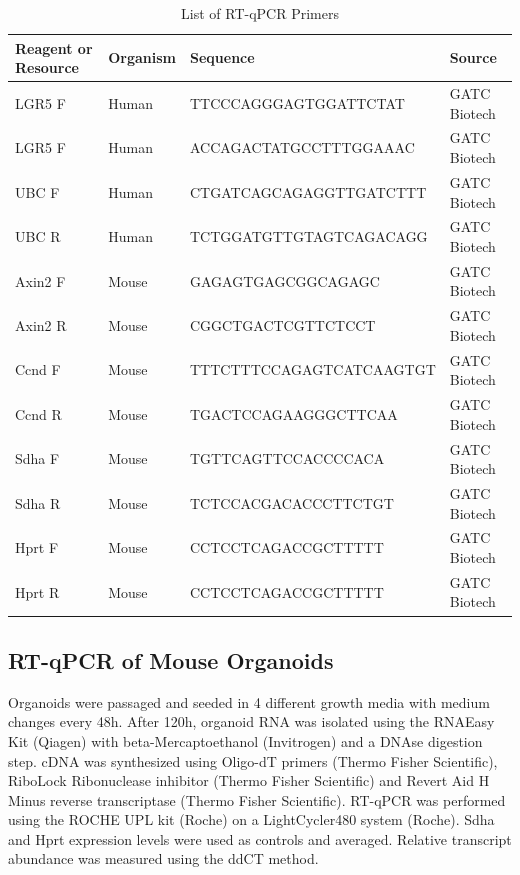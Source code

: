\begin{flushleft}
\begin{table}[htb]
\caption{List of RT-qPCR Primers}
\label{tab:qpcr} %
\begin{tabularx}{\textwidth}{lXll}
\toprule
\textbf{Reagent or Resource} & \textbf{Organism} & \textbf{Sequence} & \textbf{Source} \\
\midrule
LGR5 F & Human & TTCCCAGGGAGTGGATTCTAT & GATC Biotech \\
LGR5 F & Human & ACCAGACTATGCCTTTGGAAAC & GATC Biotech \\
UBC F & Human & CTGATCAGCAGAGGTTGATCTTT & GATC Biotech \\
UBC R & Human & TCTGGATGTTGTAGTCAGACAGG & GATC Biotech \\
Axin2 F & Mouse & GAGAGTGAGCGGCAGAGC & GATC Biotech \\
Axin2 R & Mouse & CGGCTGACTCGTTCTCCT & GATC Biotech \\
Ccnd F & Mouse & TTTCTTTCCAGAGTCATCAAGTGT & GATC Biotech \\
Ccnd R & Mouse & TGACTCCAGAAGGGCTTCAA & GATC Biotech \\
Sdha F & Mouse & TGTTCAGTTCCACCCCACA & GATC Biotech \\
Sdha R & Mouse & TCTCCACGACACCCTTCTGT & GATC Biotech \\
Hprt F & Mouse & CCTCCTCAGACCGCTTTTT & GATC Biotech \\
Hprt R & Mouse & CCTCCTCAGACCGCTTTTT & GATC Biotech \\
\bottomrule
\end{tabularx}
\end{table}

\subsection{RT-qPCR of Mouse Organoids}
Organoids were passaged and seeded in 4 different growth media with medium changes every 48h. After 120h, organoid RNA was isolated using the RNAEasy Kit (Qiagen) with beta-Mercaptoethanol (Invitrogen) and a DNAse digestion step. cDNA was synthesized using Oligo-dT primers (Thermo Fisher Scientific), RiboLock Ribonuclease inhibitor (Thermo Fisher Scientific) and Revert Aid H Minus reverse transcriptase (Thermo Fisher Scientific). RT-qPCR was performed using the ROCHE UPL kit (Roche) on a LightCycler480 system (Roche). Sdha and Hprt expression levels were used as controls and averaged. Relative transcript abundance was measured using the ddCT method.
 

\end{flushleft}
